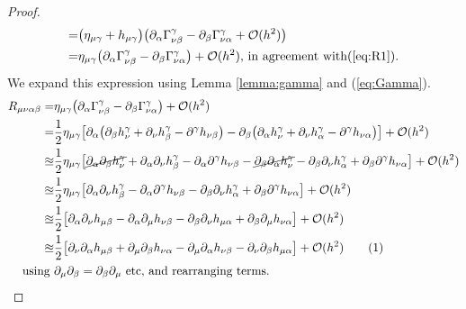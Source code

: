 \documentclass[]{article}
\newcommand\numberthis{\addtocounter{equation}{1}\tag{\theequation}}
\begin{document}
\begin{proof}
\begin{align*}
	=&\big(\eta_{\mu\gamma}+h_{\mu\gamma}\big) \big(\partial_{\alpha}\Gamma^{\gamma}_{\nu\beta} - \partial_{\beta}\Gamma^{\gamma}_{\nu\alpha} + \mathcal{O}(h^2)\big)\\
	=&\eta_{\mu\gamma}\big(\partial_{\alpha}\Gamma^{\gamma}_{\nu\beta} - \partial_{\beta}\Gamma^{\gamma}_{\nu\alpha} \big)+ \mathcal{O}(h^2)\text{, in agreement with(\ref{eq:R1}).}
	\end{align*}
	We expand this expression using Lemma \ref{lemma:gamma} and (\ref{eq:Gamma}).
	\begin{align*}
	R_{\mu\nu\alpha\beta} =&\eta_{\mu\gamma}\big(\partial_{\alpha}\Gamma^{\gamma}_{\nu\beta} - \partial_{\beta}\Gamma^{\gamma}_{\nu\alpha} \big)+ \mathcal{O}(h^2)\\
	=&\frac{1}{2}\eta_{\mu\gamma}\big[\partial_{\alpha}\big( \partial_{\beta}h^{\gamma}_{\nu} + \partial_{\nu}h^{\gamma}_{\beta}-\partial^{\gamma}h_{\nu\beta}  \big) - \partial_{\beta}\big( \partial_{\alpha}h^{\gamma}_{\nu}+\partial_{\nu}h^{\gamma}_{\alpha}-\partial^{\gamma}h_{\nu\alpha}  \big)\big]+ \mathcal{O}(h^2)\\
	\approxeq&\frac{1}{2}\eta_{\mu\gamma}\big[\cancel{\partial_{\alpha}\partial_{\beta}h^{\gamma}_{\nu}} + \partial_{\alpha}\partial_{\nu}h^{\gamma}_{\beta}-\partial_{\alpha}\partial^{\gamma}h_{\nu\beta}  -  \cancel{\partial_{\beta}\partial_{\alpha}h^{\gamma}_{\nu}}-\partial_{\beta}\partial_{\nu}h^{\gamma}_{\alpha}+\partial_{\beta}\partial^{\gamma}h_{\nu\alpha}  \big]+ \mathcal{O}(h^2)\\
	\approxeq&\frac{1}{2}\eta_{\mu\gamma}\big[ \partial_{\alpha}\partial_{\nu}h^{\gamma}_{\beta}-\partial_{\alpha}\partial^{\gamma}h_{\nu\beta}  -\partial_{\beta}\partial_{\nu}h^{\gamma}_{\alpha}+\partial_{\beta}\partial^{\gamma}h_{\nu\alpha}  \big]+ \mathcal{O}(h^2)
	\\
	\approxeq&\frac{1}{2}\big[ \partial_{\alpha}\partial_{\nu}h_{\mu\beta}-\partial_{\alpha}\partial_{\mu}h_{\nu\beta}  -\partial_{\beta}\partial_{\nu}h_{\mu\alpha}+\partial_{\beta}\partial_{\mu}h_{\nu\alpha}  \big]+ \mathcal{O}(h^2)\\
	\approxeq&\frac{1}{2}\big[\partial_{\nu}\partial_{\alpha}h_{\mu\beta} + \partial_{\mu}\partial_{\beta}h_{\nu\alpha} - \partial_{\mu}\partial_{\alpha}h_{\nu\beta} - \partial_{\nu}\partial_{\beta}h_{\mu\alpha}\big]+ \mathcal{O}(h^2) \numberthis\label{eq:R}\\
	\text{using }& \partial_{\mu}\partial_{\beta}=\partial_{\beta}\partial_{\mu} \text{ etc, and rearranging terms.}
	\end{align*}

\end{proof}
\end{document}
